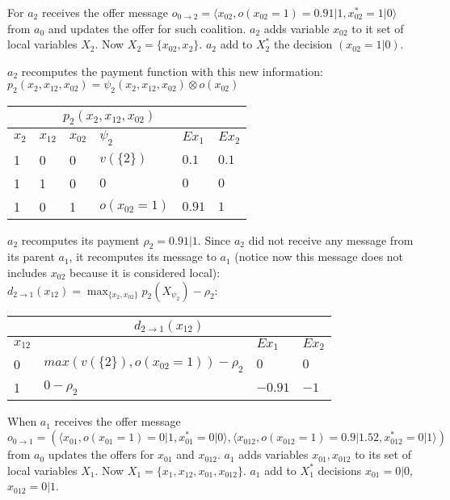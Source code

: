 \documentclass{article}
\begin{document}
\begin{itemize}
\end{itemize}

\noindent For $a_2$ receives the offer message $o_{0\rightarrow 2}=\langle
x_{02}, o(x_{02}=1) = 0.91\vert 1, x^*_{02}=1 \vert 0\rangle$ from $a_0$ and updates the offer for
such coalition. $a_2$ adds variable $x_{02}$ to it set of local variables $X_2$. Now
$X_2=\{x_{02},x_{2}\}$. $a_2$ add to $X^{*}_2$ the decision
$(x_{02}=1 \vert 0)$.



\noindent $a_2$ recomputes the payment function with this new information:
$p_2(x_{2},x_{12},x_{02}) = \psi_2(x_{2},x_{12},x_{02}) \otimes o(x_{02}) $


\noindent\begin{tabular}{ | l | l |  l | l | l | l | }
\multicolumn{5}{c}{$p_2(x_{2},x_{12},x_{02})$}  \\
\hline
	$x_{2}$ &	$x_{12}$ & $x_{02}$ & $\psi_2$ & $Ex_1$ & $Ex_2$ \\
\hline
	1	 &		0	 &	0	& $v(\{2\})$ & $0.1$ & $0.1$\\
	1	 &		1	 &	0	& $0$ & $0$ & $0$ \\
	1	 &		0	 &	1	& $o(x_{02}=1)$ & $0.91$ & $1$\\
\hline
\end{tabular}


\noindent$a_2$ recomputes its payment $\rho_2= 0.91 \vert 1$.
Since $a_2$ did not receive any message from its parent $a_1$, it recomputes its
message to $a_1$ (notice now this message does not includes $x_{02}$ because it
is considered local):$d_{2\rightarrow 1}(x_{12})=
\max_{\{x_2,x_{02}\}}p_2(X_{\psi_2})- \rho_2$:

\noindent\begin{tabular}{ | l | l | l |l | }
\multicolumn{4}{c}{$d_{2\rightarrow 1}(x_{12})$}  \\
\hline
	$x_{12}$ &   & $Ex_1$ & $Ex_2$\\
\hline
	0	& 	$max(v(\{2\}),o(x_{02}=1))-\rho_2$ & $0$ & $0$ \\
	1	&   $0 -\rho_2 $ & $-0.91$ & $-1$\\
\hline
\end{tabular}



\vspace{0.1in}\noindent When $a_1$ receives the offer message $o_{0\rightarrow
1} =(\langle x_{01}, o(x_{01}=1) = 0\vert 1,\allowbreak x^*_{01}=0\vert 0 \rangle,\langle
x_{012}, o(x_{012}=1) = 0.9\vert 1.52, x^*_{012}=0\vert 1 \rangle)$ from $a_0$
updates the offers for $x_{01}$ and $x_{012}$. $a_1$ adds variables
$x_{01},x_{012}$ to its set of local variables $X_1$. Now
$X_1=\{x_{1},x_{12},x_{01},x_{012}\}$. $a_1$ add to $X^{*}_1$
decisions $x_{01}=0\vert 0$,$x_{012}=0\vert 1$.
\end{document}
